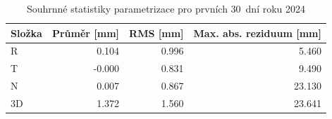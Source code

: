 \begin{table}[H]
\centering
\small
\caption{Souhrnné statistiky parametrizace pro prvních 30~dní roku 2024}
\label{tab:sa_za_rms_summary}
\begin{tabular}{lrrr}
\toprule
Složka & Průměr [mm] & RMS [mm] & Max. abs. reziduum [mm] \\
\midrule
R & 0.104 & 0.996 & 5.460 \\
T & -0.000 & 0.831 & 9.490 \\
N & 0.007 & 0.867 & 23.130 \\
3D & 1.372 & 1.560 & 23.641 \\
\bottomrule
\end{tabular}
\end{table}
